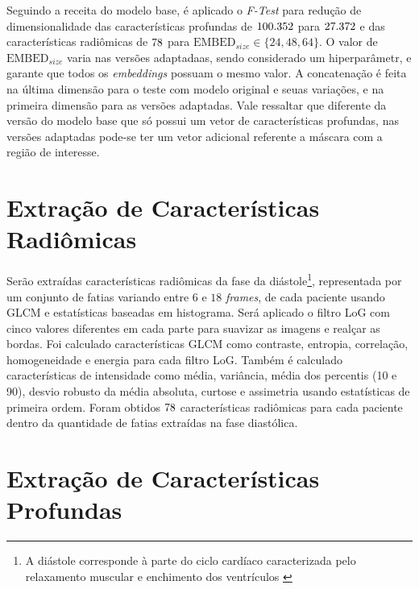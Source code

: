 Seguindo a receita do modelo base, é aplicado o \textit{F-Test} para redução de dimensionalidade das características profundas de $100.352$ para $27.372$ e das características radiômicas de $78$ para $\text{EMBED}_{size} \in \{24, 48, 64\}$. O valor de $\text{EMBED}_{size}$ varia nas versões adaptadaas, sendo considerado um hiperparâmetr, e garante que todos os \textit{embeddings} possuam o mesmo valor. A concatenação é feita na última dimensão para o teste com modelo original e seuas variações, e na primeira dimensão para as versões adaptadas. Vale ressaltar que diferente da versão do modelo base que só possui um vetor de características profundas, nas versões adaptadas pode-se ter um vetor adicional referente a máscara com a região de interesse. 

\section{Extração de Características Radiômicas}
\label{subsec:cap4_caracteristicas_radiomicas}

Serão extraídas características radiômicas da fase da diástole\footnote{A diástole corresponde à parte do ciclo cardíaco caracterizada pelo relaxamento muscular e enchimento dos ventrículos \cite{brielerCardiomyopathyOverview2017}}, representada por um conjunto de fatias variando entre $6$ e $18$ \textit{frames}, de cada paciente usando \gls{GLCM} e estatísticas baseadas em histograma. Será aplicado o filtro \gls{LoG} com cinco valores diferentes em cada parte para suavizar as imagens e realçar as bordas. Foi calculado características \gls{GLCM} como contraste, entropia, correlação, homogeneidade e energia para cada filtro \gls{LoG}. Também é calculado características de intensidade como média, variância, média dos percentis (10 e 90), desvio robusto da média absoluta, curtose e assimetria usando estatísticas de primeira ordem. Foram obtidos $78$ características radiômicas para cada paciente dentro da quantidade de fatias extraídas na fase diastólica.

\section{Extração de Características Profundas}
\label{subsec:cap4_caracteristicas_profundas}
 
